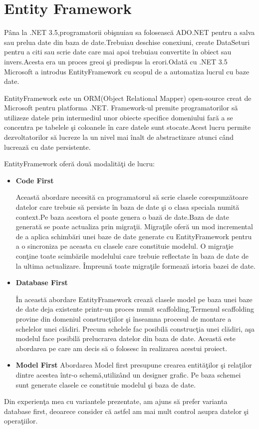 \documentclass[a4paper,12pt]{report}
\begin{document}
\section{Entity Framework}
P\^ana la .NET 3.5,programatorii obi\c snuiau sa foloseasc\u a ADO.NET pentru a salva sau prelua date din 
baza de date.Trebuiau deschise conexiuni, create DataSeturi pentru a citi sau scrie date care mai apoi trebuiau 
convertite \^in obiect sau invers.Acesta era un proces greoi \c si predispus la erori.Odat\u a cu .NET 3.5
Microsoft a introdus EntityFramework cu scopul de a automatiza lucrul cu baze date.

EntityFramework este un ORM(Object Relational Mapper) open-source creat de Microsoft pentru platforma .NET.
Framework-ul premite programatorilor s\u a utilizeze datele prin intermediul  unor obiecte specifice domeniului
far\u a a se concentra pe tabelele \c si coloanele \^in care datele sunt stocate.Acest lucru permite dezvoltatorilor 
s\u a lucreze la un nivel mai \^inalt de abstractizare atunci c\^ and lucreaz\u a cu date persistente.

EntityFramework ofer\u a dou\u a modalit\u a\c ti de lucru:
\begin{itemize}
	\item \textbf{Code First}

		Aceast\u a abordare necesit\u a ca programatorul s\u a scrie clasele corespunz\u atoare datelor care trebuie s\u a persiste \^in baza de date \c si 
		o clasa speciala numit\u a context.Pe baza acestora el poate genera o baz\u a de date.Baza de date generat\u a
		se poate actualiza prin migra\c tii. Migra\c tile ofer\u a un mod incremental de a aplica schimb\u ari unei baze
		de date generate cu EntityFramework pentru a o sincroniza pe aceasta cu clasele care constituie modelul. O migra\c tie
		con\c tine toate scimb\u arile modelului care trebuie reflectate \^in baza de date de la ultima actualizare.
		\^Impreun\u a toate migra\c tile formeaz\u a istoria bazei de date.

	\item \textbf{Database First}

		\^In aceast\u a abordare EntityFramework creaz\u a clasele model pe baza unei baze de date deja existente printr-un proces numit
		scaffolding.Termenul scaffolding provine din domeniul construc\c tiilor \c si \^inseamna procesul de montare a schelelor unei cl\u adiri.
		Precum schelele fac posibil\u a construc\c tia unei cl\u adiri, a\c sa modelul face posibil\u a prelucrarea datelor din baza de date.
		Aceast\u a este abordarea pe care am decis s\u a o folosesc \^in realizarea acestui proiect.
	\item \textbf{Model First}
		Abordarea Model first presupune crearea entit\u a\c tilor \c si rela\c tilor dintre acestea \^intr-o schem\u a,utiliz\^and un designer grafic.
		Pe baza schemei sunt generate clasele ce constituie modelul \c si baza de date.
\end{itemize} 
Din experien\c ta mea cu variantele prezentate, am ajuns s\u a prefer varianta database first, deoarece consider c\u a astfel am mai mult control
asupra datelor \c si opera\c tiilor.
\end{document}
